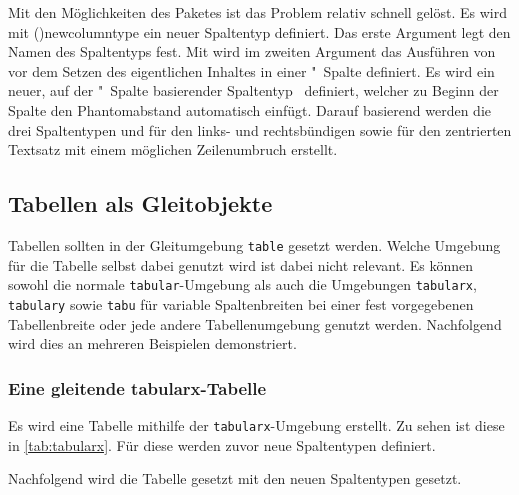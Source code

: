\documentclass[%
  english,ngerman,%
  cdgeometry=no,DIV=12,%
  cd=false,cdfont=false,cdtitle=true,%
  headings=normal,%
  automark,%
  listof=toc,%
]{tudscrartcl}
\begin{document}
Mit den Möglichkeiten des Paketes  ist das Problem relativ 
schnell gelöst. Es wird mit \Macro(){newcolumntype} ein neuer 
Spaltentyp definiert. Das erste Argument legt den Namen des Spaltentyps fest. 
Mit  wird im zweiten Argument 
das Ausführen von  vor dem Setzen des eigentlichen Inhaltes 
in einer "~Spalte definiert. Es wird ein neuer, auf der 
"~Spalte basierender Spaltentyp~ definiert, welcher zu 
Beginn der Spalte den Phantomabstand automatisch einfügt. Darauf basierend 
werden die drei Spaltentypen  und  für den links- und 
rechtsbündigen sowie  für den zentrierten Textsatz mit einem 
möglichen Zeilenumbruch erstellt.
%
\begin{Trunk+}
\subsection{Tabellen als Gleitobjekte}

Tabellen sollten in der Gleitumgebung \texttt{table} gesetzt werden. 
Welche Umgebung für die Tabelle selbst dabei genutzt wird ist dabei
nicht relevant. Es können sowohl die normale \texttt{tabular}-Umgebung 
als auch die Umgebungen \texttt{tabularx}, \texttt{tabulary} sowie 
\texttt{tabu} für variable Spaltenbreiten bei einer fest vorgegebenen 
Tabellenbreite oder jede andere Tabellenumgebung genutzt werden. 
Nachfolgend wird dies an mehreren Beispielen demonstriert.

\subsubsection{Eine gleitende tabularx-Tabelle}

Es wird eine Tabelle mithilfe der \texttt{tabularx}-Umgebung erstellt. 
Zu sehen ist diese in \autoref{tab:tabularx}. Für diese werden zuvor 
neue Spaltentypen definiert.

\end{Trunk+}
\CodeHook{\renewcommand*{\newcolumntype}[2]{}}
\begin{Trunk*}

\end{Trunk*}
%
Nachfolgend wird die Tabelle gesetzt mit den neuen Spaltentypen gesetzt.
%
\end{document}
